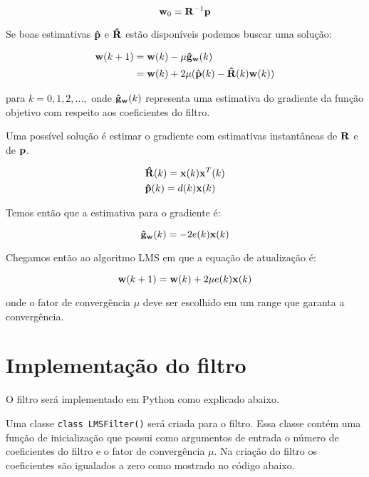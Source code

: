 \begin{equation}
{\bf w}_0 = {\bf R}^{-1}{\bf p}
\end{equation}

Se boas estimativas ${\bf \hat{p}}$ e ${\bf \hat{R}}$ estão disponíveis podemos buscar uma solução:

\begin{align}
{\bf w}(k+1) & = {\bf w}(k) - \mu {\bf \hat{g}_w}(k) \\
& = {\bf w}(k) + 2 \mu ({\bf \hat{p}}(k) - {\bf \hat{R}}(k){\bf w}(k))
\end{align}

para $k = 0, 1, 2,...,$ onde ${\bf \hat{g}_w}(k)$ representa uma estimativa do gradiente da função objetivo com respeito aos coeficientes do filtro.

Uma possível solução é estimar o gradiente com estimativas instantâneas de ${\bf R}$ e de ${\bf p}$.

\begin{align}
& {\bf \hat{R}}(k) = {\bf x}(k) {\bf x}^T(k) \\
& {\bf \hat{p}}(k) = d(k)       {\bf x}(k)
\end{align}

Temos então que a estimativa para o gradiente é:

\begin{equation}
{\bf \hat{g}_w}(k) = -2e(k){\bf x}(k)
\end{equation}

Chegamos então ao algoritmo LMS em que a equação de atualização é:

\begin{equation}\label{eq:LMS}
{\bf w}(k+1) = {\bf w}(k) + 2 \mu e(k) {\bf x}(k)
\end{equation}

onde o fator de convergência $\mu$ deve ser escolhido em um range que garanta a convergência.

\section{Implementação do filtro}

O filtro será implementado em Python como explicado abaixo.

Uma classe \texttt{class LMSFilter()} será criada para o filtro. Essa classe contém uma função de inicialização que possui como argumentos de entrada o número de coeficientes do filtro e o fator de convergência $\mu$. Na criação do filtro os coeficientes são igualados a zero como mostrado no código abaixo.

